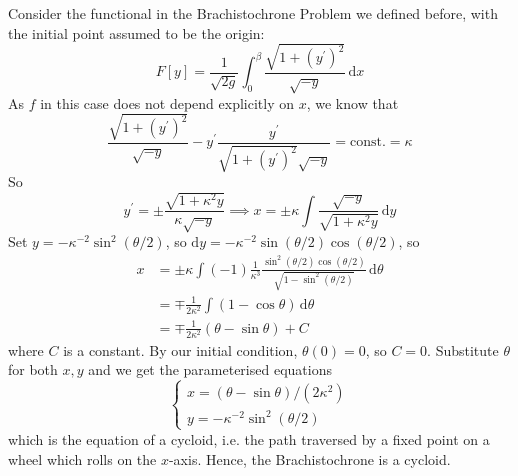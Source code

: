 \documentclass{article}
\begin{document}
\begin{example}
    Consider the functional in the Brachistochrone Problem we defined before, with the initial point assumed to be the origin:
    $$F[y]=\frac{1}{\sqrt{2g}}\int_0^\beta\frac{\sqrt{1+(y^\prime)^2}}{\sqrt{-y}}\,\mathrm dx$$
    As $f$ in this case does not depend explicitly on $x$, we know that
    $$\frac{\sqrt{1+(y^\prime)^2}}{\sqrt{-y}}-y^\prime\frac{y^\prime}{\sqrt{1+(y^\prime)^2}\sqrt{-y}}=\text{const.}=\kappa$$
    So
    $$y^\prime=\pm\frac{\sqrt{1+\kappa^2y}}{\kappa\sqrt{-y}}\implies x=\pm \kappa\int\frac{\sqrt{-y}}{\sqrt{1+\kappa^2y}}\,\mathrm dy$$
    Set $y=-\kappa^{-2}\sin^2(\theta/2)$, so $\mathrm dy=-\kappa^{-2}\sin(\theta/2)\cos(\theta/2)$, so
    \begin{align*}
        x&=\pm \kappa\int(-1)\frac{1}{\kappa^3}\frac{\sin^2(\theta/2)\cos(\theta/2)}{\sqrt{1-\sin^2(\theta/2)}}\,\mathrm d\theta\\
        &=\mp\frac{1}{2\kappa^2}\int(1-\cos\theta)\,\mathrm d\theta\\
        &=\mp\frac{1}{2\kappa^2}(\theta-\sin\theta)+C
    \end{align*}
    where $C$ is a constant.
    By our initial condition, $\theta(0)=0$, so $C=0$.
    Substitute $\theta$ for both $x,y$ and we get the parameterised equations
    $$\begin{cases}
        x=(\theta-\sin\theta)/(2\kappa^2)\\
        y=-\kappa^{-2}\sin^2(\theta/2)
    \end{cases}$$
    which is the equation of a cycloid, i.e. the path traversed by a fixed point on a wheel which rolls on the $x$-axis.
    Hence, the Brachistochrone is a cycloid.

    \begin{center}
\end{center}
\end{example}
\end{document}
